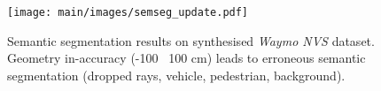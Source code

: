 \begin{figure}[t]
    \centering
        \texttt{[image: main/images/semseg\_update.pdf]}
        \caption{Semantic segmentation results on synthesised \textit{Waymo NVS} dataset. Geometry in-accuracy (-100 \bwr~100 cm) leads to erroneous semantic segmentation ({\setlength{\fboxsep}{0pt}\colorbox{ourgray}{dropped rays}}, {\setlength{\fboxsep}{0pt}\colorbox{sem0}{vehicle}}, {\setlength{\fboxsep}{0pt}\colorbox{sem1}{pedestrian}}, {\setlength{\fboxsep}{0pt}\colorbox{sem2}{background}}).}
    \label{fig:iccv_semseg}
\end{figure}